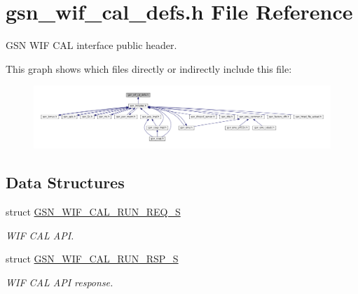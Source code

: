 \hypertarget{a00607}{
\section{gsn\_\-wif\_\-cal\_\-defs.h File Reference}
\label{a00607}
}


GSN WIF CAL interface public header.  


This graph shows which files directly or indirectly include this file:
\nopagebreak
\begin{figure}[H]
\begin{center}
\leavevmode
\includegraphics[width=400pt]{a00854}
\end{center}
\end{figure}
\subsection*{Data Structures}
\begin{DoxyCompactItemize}
\item 
struct \hyperlink{a00319}{GSN\_\-WIF\_\-CAL\_\-RUN\_\-REQ\_\-S}
\begin{DoxyCompactList}\small\item\em WIF CAL API. \end{DoxyCompactList}\item 
struct \hyperlink{a00320}{GSN\_\-WIF\_\-CAL\_\-RUN\_\-RSP\_\-S}
\begin{DoxyCompactList}\small\item\em WIF CAL API response. \end{DoxyCompactList}\end{DoxyCompactItemize}
